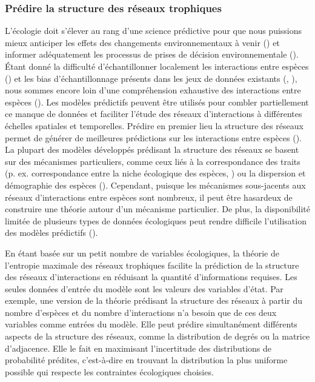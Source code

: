 \subsubsection{Prédire la structure des réseaux trophiques} 

L'écologie doit s'élever au rang d'une science prédictive pour que nous
puissions mieux anticiper les effets des changements environnementaux à venir
(\cite{Evans2012Predictive}) et informer adéquatement les processus de prises de
décision environnementale (\cite{Clark2001Ecological}). Étant donné la
difficulté d'échantillonner localement les interactions entre espèces
(\cite{Jordano2016Sampling}) et les bias d'échantillonnage présents dans les
jeux de données existants (\cite{Aguiar2019Revealing}, \cite{Poisot2021Global}),
nous sommes encore loin d'une compréhension exhaustive des interactions entre
espèces (\cite{Hortal2015Seven}). Les modèles prédictifs peuvent être utilisés
pour combler partiellement ce manque de données et faciliter l'étude des réseaux
d'interactions à différentes échelles spatiales et temporelles. Prédire en
premier lieu la structure des réseaux permet de générer de meilleures
prédictions sur les interactions entre espèces (\cite{Strydom2021Roadmapa}). La
plupart des modèles développés prédisant la structure des réseaux se basent sur
des mécanismes particuliers, comme ceux liés à la correspondance des traits (p.
ex. correspondance entre la niche écologique des espèces,
\cite{Williams2000Simple}) ou la dispersion et démographie des espèces
(\cite{Canard2012Emergence}). Cependant, puisque les mécanismes sous-jacents aux
réseaux d'interactions entre espèces sont nombreux, il peut être hasardeux de
construire une théorie autour d'un mécanisme particulier. De plus, la
disponibilité limitée de plusieurs types de données écologiques peut rendre
difficile l'utilisation des modèles prédictifs (\cite{Strydom2021Roadmapa}). 

En étant basée sur un petit nombre de variables écologiques, la théorie de
l'entropie maximale des réseaux trophiques facilite la prédiction de la
structure des réseaux d'interactions en réduisant la quantité d'informations
requises. Les seules données d'entrée du modèle sont les valeurs des variables
d'état. Par exemple, une version de la théorie prédisant la structure des
réseaux à partir du nombre d'espèces et du nombre d'interactions n'a besoin que
de ces deux variables comme entrées du modèle. Elle peut prédire simultanément
différents aspects de la structure des réseaux, comme la distribution de degrés
ou la matrice d'adjacence. Elle le fait en maximisant l'incertitude des 
distributions de probabilité prédites, c'est-à-dire en trouvant la distribution 
la plus uniforme possible qui respecte les contraintes écologiques choisies. 

